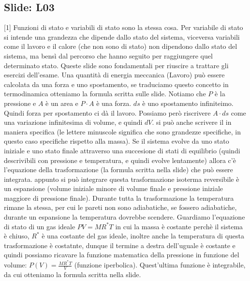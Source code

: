 \subsection{Slide: L03}
[1]
\newline[2] Funzioni di stato e variabili di stato sono la stessa cosa. Per variabile di stato si intende una grandezza che dipende dallo stato del sistema, viceversa variabili come il lavoro e il calore (che non sono di stato) non dipendono dallo stato del sistema, ma bensì dal percorso che hanno seguito per raggiungere quel determinato stato. Queste slide sono fondamentali per riuscire a trattare gli esercizi dell'esame.
\newline[3] Una quantità di energia meccanica (Lavoro) può essere calcolata da una forza e uno spostamento, se traduciamo questo concetto in termodinamica otteniamo la formula scritta sulle slide. Notiamo che $P$ è la pressione e $A$ è un area e $P \cdot A$ è una forza. $ds$ è uno spostamento infiniteimo. Quindi forza per spostamento ci dà il lavoro. Possiamo però riscrivere $A \cdot ds$ come una variazione infinitesima di volume, e quindi $dV$. 
\newline[4] si può anche scrivere il in maniera specifica (le lettere minuscole significa che sono grandezze specifiche, in questo caso specifiche rispetto alla massa). Se il sistema evolve da uno stato iniziale e uno stato finale attraverso una succesione di stati di equilibrio (quindi descrivibili con pressione e temperatura, e quindi evolve lentamente) allora c'è l'equazione della trasformazione (la formula scritta nella slide) che può essere integrata.
\newline[5] appunto si può integrare
\newline[6] questa trasformazione isoterma reversibile è un espansione (volume iniziale minore di volume finale e pressione iniziale maggiore di pressione finale). Durante tutta la trasformazione la temperatura rimane la stessa, per cui le pareti non sono adiabatiche, se fossero adiabatiche, durante un espansione la temperatura dovrebbe scendere. Guardiamo l'equazione di stato di un gas ideale $PV = MR^{*}T$ in cui la massa è costante perchè il sistema è chiuso, $R^*$ è una costante del gas ideale, inoltre anche la temperatura di questa trasformazione è costatnte, dunque il termine a destra dell'uguale è costante e quindi possiamo ricavare la funzione matematica della pressione in funzione del volume: $P(V) = \frac{MR^*T}{V}$ (funzione iperbolica). Quest'ultima funzione  è integrabile, da cui otteniamo la formula scritta nella slide.
